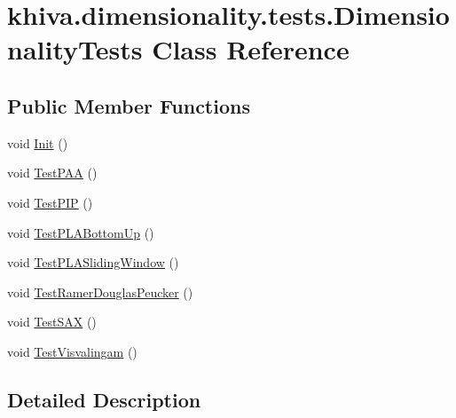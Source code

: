 \hypertarget{classkhiva_1_1dimensionality_1_1tests_1_1_dimensionality_tests}{}\section{khiva.\+dimensionality.\+tests.\+Dimensionality\+Tests Class Reference}
\label{classkhiva_1_1dimensionality_1_1tests_1_1_dimensionality_tests}
\subsection*{Public Member Functions}
\begin{DoxyCompactItemize}
\item 
void \mbox{\hyperlink{classkhiva_1_1dimensionality_1_1tests_1_1_dimensionality_tests_aae3d36c0db57f5d5137554b0887dc6a1}{Init}} ()
\item 
void \mbox{\hyperlink{classkhiva_1_1dimensionality_1_1tests_1_1_dimensionality_tests_a6cac6f4126779021cc77337770c8a78e}{Test\+P\+AA}} ()
\item 
void \mbox{\hyperlink{classkhiva_1_1dimensionality_1_1tests_1_1_dimensionality_tests_af34eb904196c9410e9fa203bd6743fd7}{Test\+P\+IP}} ()
\item 
void \mbox{\hyperlink{classkhiva_1_1dimensionality_1_1tests_1_1_dimensionality_tests_a9f6bcad724ef0b8f7e6f573d2fdde4bf}{Test\+P\+L\+A\+Bottom\+Up}} ()
\item 
void \mbox{\hyperlink{classkhiva_1_1dimensionality_1_1tests_1_1_dimensionality_tests_ae25912345444c48dae23ff5ae7f989ab}{Test\+P\+L\+A\+Sliding\+Window}} ()
\item 
void \mbox{\hyperlink{classkhiva_1_1dimensionality_1_1tests_1_1_dimensionality_tests_aa0e010d2afe7bf019a4ddf2baa68ef3a}{Test\+Ramer\+Douglas\+Peucker}} ()
\item 
void \mbox{\hyperlink{classkhiva_1_1dimensionality_1_1tests_1_1_dimensionality_tests_a28b9e6627b9cdca9717a8f143d5ea9de}{Test\+S\+AX}} ()
\item 
void \mbox{\hyperlink{classkhiva_1_1dimensionality_1_1tests_1_1_dimensionality_tests_ab8f56577510e09c8df597152cbb1265d}{Test\+Visvalingam}} ()
\end{DoxyCompactItemize}


\subsection{Detailed Description}


